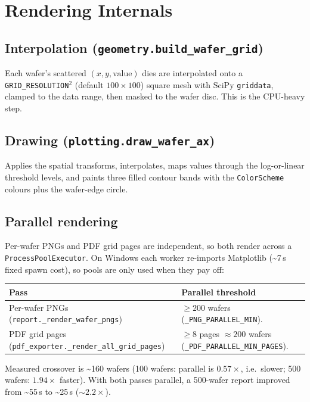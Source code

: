 \documentclass[11pt,a4paper]{report}
\newcommand{\code}[1]{\texttt{#1}}
\begin{document}
\chapter{Rendering Internals}\label{ch:render}

\section{Interpolation (\code{geometry.build\_wafer\_grid})}
Each wafer's scattered $(x,y,\text{value})$ dies are interpolated onto a
\code{GRID\_RESOLUTION}$^2$ (default $100\times100$) square mesh with SciPy
\code{griddata}, clamped to the data range, then masked to the wafer disc. This
is the CPU-heavy step.

\section{Drawing (\code{plotting.draw\_wafer\_ax})}
Applies the spatial transforms, interpolates, maps values through the
log-or-linear threshold levels, and paints three filled contour bands with the
\code{ColorScheme} colours plus the wafer-edge circle.

\section{Parallel rendering}
Per-wafer PNGs and PDF grid pages are independent, so both render across a
\code{ProcessPoolExecutor}. On Windows each worker re-imports Matplotlib
(\textasciitilde7\,s fixed spawn cost), so pools are only used when they pay off:

\begin{longtable}{@{}p{6.5cm}p{8.0cm}@{}}
\toprule
\textbf{Pass} & \textbf{Parallel threshold}\\
\midrule
\endhead
Per-wafer PNGs (\code{report.\_render\_wafer\_pngs}) & $\ge 200$ wafers
  (\code{\_PNG\_PARALLEL\_MIN}).\\
PDF grid pages (\code{pdf\_exporter.\_render\_all\_grid\_pages}) & $\ge 8$ pages
  $\approx 200$ wafers (\code{\_PDF\_PARALLEL\_MIN\_PAGES}).\\
\bottomrule
\end{longtable}

\noindent Measured crossover is \textasciitilde160 wafers (100 wafers: parallel
is $0.57\times$, i.e.\ slower; 500 wafers: $1.94\times$ faster). With both passes
parallel, a 500-wafer report improved from \textasciitilde55\,s to
\textasciitilde25\,s ($\sim2.2\times$).
\end{document}
